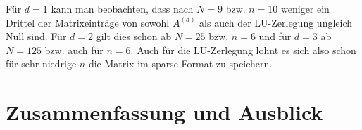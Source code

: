 \documentclass{scrartcl}
\begin{document}
Für $d=1$ kann man beobachten, dass nach $N=9$ bzw. $n=10$  weniger ein Drittel der Matrixeinträge von sowohl $A^{(d)}$ als auch der LU-Zerlegung ungleich Null sind.
Für $d=2$ gilt dies schon ab $N=25$ bzw. $n=6$ und für $d=3$ ab $N = 125$ bzw. auch für $n=6$.
Auch für die LU-Zerlegung lohnt es sich also schon für sehr niedrige $n$ die Matrix im sparse-Format zu speichern.

\pagebreak
\section{Zusammenfassung und Ausblick}


\pagebreak



\end{document}
